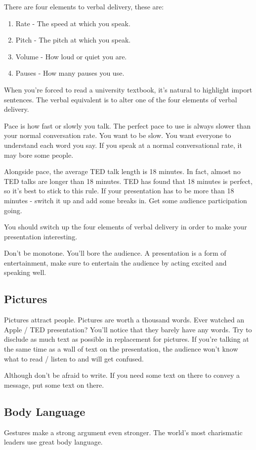 \documentclass{article}
\begin{document}
There are four elements to verbal delivery, these are:
\begin{enumerate}
\def\labelenumi{\arabic{enumi}.}
\item
  Rate - The speed at which you speak.
\item
  Pitch - The pitch at which you speak.
\item
  Volume - How loud or quiet you are.
\item
  Pauses - How many pauses you use.
\end{enumerate}

When you're forced to read a university textbook, it's natural to
highlight import sentences. The verbal equivalent is to alter one of the
four elements of verbal delivery.

Pace is how fast or slowly you talk. The perfect pace to use is always
slower than your normal conversation rate. You want to be slow. You want
everyone to understand each word you say. If you speak at a normal
conversational rate, it may bore some people.

Alongside pace, the average TED talk length is 18 minutes. In fact,
almost no TED talks are longer than 18 minutes. TED has found that 18
minutes is perfect, so it's best to stick to this rule. If your
presentation has to be more than 18 minutes - switch it up and add some
breaks in. Get some audience participation going.

You should switch up the four elements of verbal delivery in order to
make your presentation interesting.

Don't be monotone. You'll bore the audience. A presentation is a form of
entertainment, make sure to entertain the audience by acting excited and
speaking well.
\subsection{Pictures}
Pictures attract people. Pictures are worth a thousand words. Ever
watched an Apple / TED presentation? You'll notice that they barely have
any words. Try to disclude as much text as possible in replacement for
pictures. If you're talking at the same time as a wall of text on the
presentation, the audience won't know what to read / listen to and will
get confused.

Although don't be afraid to write. If you need some text on there to
convey a message, put some text on there.
\subsection{Body Language}
Gestures make a strong argument even stronger. The world's most
charismatic leaders use great body language.
\end{document}
